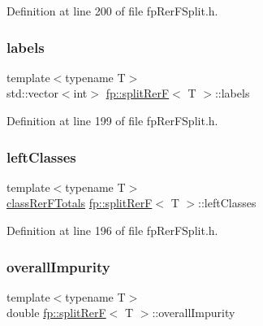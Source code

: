 Definition at line 200 of file fp\+Rer\+F\+Split.\+h.

\mbox{\label{classfp_1_1splitRerF_a85d708ae07bbfae5205111082e4037df}} 
\subsubsection{\texorpdfstring{labels}{labels}}
{\footnotesize\ttfamily template$<$typename T$>$ \\
std\+::vector$<$int$>$ \hyperlink{classfp_1_1splitRerF}{fp\+::split\+RerF}$<$ T $>$\+::labels\hspace{0.3cm}{\ttfamily [protected]}}



Definition at line 199 of file fp\+Rer\+F\+Split.\+h.

\mbox{\label{classfp_1_1splitRerF_aa5aa4856a4bc8e5f0852d8e6fa935cfc}} 
\subsubsection{\texorpdfstring{left\+Classes}{leftClasses}}
{\footnotesize\ttfamily template$<$typename T$>$ \\
\hyperlink{classfp_1_1classRerFTotals}{class\+Rer\+F\+Totals} \hyperlink{classfp_1_1splitRerF}{fp\+::split\+RerF}$<$ T $>$\+::left\+Classes\hspace{0.3cm}{\ttfamily [protected]}}



Definition at line 196 of file fp\+Rer\+F\+Split.\+h.

\mbox{\label{classfp_1_1splitRerF_a4b2291a2bf5d4bd6b7d45b0e7037c5cc}} 
\subsubsection{\texorpdfstring{overall\+Impurity}{overallImpurity}}
{\footnotesize\ttfamily template$<$typename T$>$ \\
double \hyperlink{classfp_1_1splitRerF}{fp\+::split\+RerF}$<$ T $>$\+::overall\+Impurity\hspace{0.3cm}{\ttfamily [protected]}}



